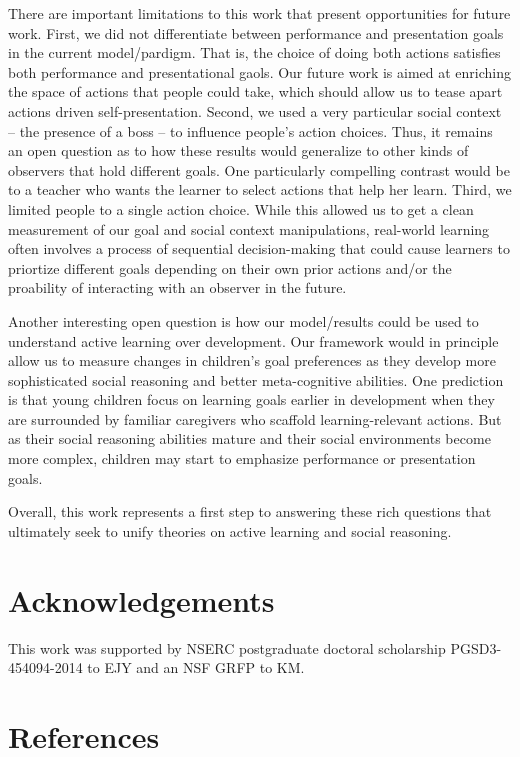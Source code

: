 \documentclass[10pt, letterpaper]{article}
\begin{document}
There are important limitations to this work that present opportunities
for future work. First, we did not differentiate between performance and
presentation goals in the current model/pardigm. That is, the choice of
doing both actions satisfies both performance and presentational gaols.
Our future work is aimed at enriching the space of actions that people
could take, which should allow us to tease apart actions driven
self-presentation. Second, we used a very particular social context --
the presence of a boss -- to influence people's action choices. Thus, it
remains an open question as to how these results would generalize to
other kinds of observers that hold different goals. One particularly
compelling contrast would be to a teacher who wants the learner to
select actions that help her learn. Third, we limited people to a single
action choice. While this allowed us to get a clean measurement of our
goal and social context manipulations, real-world learning often
involves a process of sequential decision-making that could cause
learners to priortize different goals depending on their own prior
actions and/or the proability of interacting with an observer in the
future.

Another interesting open question is how our model/results could be used
to understand active learning over development. Our framework would in
principle allow us to measure changes in children's goal preferences as
they develop more sophisticated social reasoning and better
meta-cognitive abilities. One prediction is that young children focus on
learning goals earlier in development when they are surrounded by
familiar caregivers who scaffold learning-relevant actions. But as their
social reasoning abilities mature and their social environments become
more complex, children may start to emphasize performance or
presentation goals.

Overall, this work represents a first step to answering these rich
questions that ultimately seek to unify theories on active learning and
social reasoning.

\section{Acknowledgements}\label{acknowledgements}

This work was supported by NSERC postgraduate doctoral scholarship
PGSD3-454094-2014 to EJY and an NSF GRFP to KM.

\section{References}\label{references}
\end{document}
